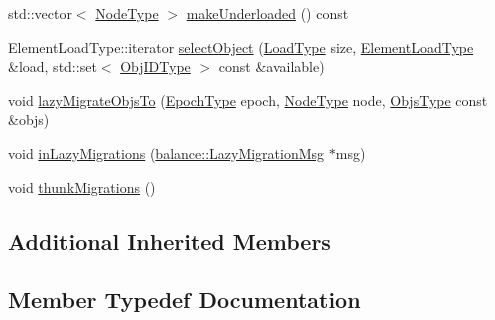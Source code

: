 \begin{DoxyCompactItemize}
\item 
std\+::vector$<$ \hyperlink{namespacevt_a866da9d0efc19c0a1ce79e9e492f47e2}{Node\+Type} $>$ \hyperlink{structvt_1_1vrt_1_1collection_1_1lb_1_1_gossip_l_b_a244326d030b7b9b82328d2ce617fef43}{make\+Underloaded} () const
\item 
Element\+Load\+Type\+::iterator \hyperlink{structvt_1_1vrt_1_1collection_1_1lb_1_1_gossip_l_b_adafa0d7c3295e095149f48c3027b3173}{select\+Object} (\hyperlink{structvt_1_1vrt_1_1collection_1_1lb_1_1_base_l_b_a215e22b9f12678303f49615ae3be05cc}{Load\+Type} size, \hyperlink{structvt_1_1vrt_1_1collection_1_1lb_1_1_base_l_b_aa286d31a0820a8fc9218ccb858368fca}{Element\+Load\+Type} \&load, std\+::set$<$ \hyperlink{structvt_1_1vrt_1_1collection_1_1lb_1_1_base_l_b_a15a2f756b59c8c2437985206b32aa403}{Obj\+I\+D\+Type} $>$ const \&available)
\item 
void \hyperlink{structvt_1_1vrt_1_1collection_1_1lb_1_1_gossip_l_b_a12cd87d3d0f4c186ffca1b554f5086dc}{lazy\+Migrate\+Objs\+To} (\hyperlink{namespacevt_a985a5adf291c34a3ca263b3378388236}{Epoch\+Type} epoch, \hyperlink{namespacevt_a866da9d0efc19c0a1ce79e9e492f47e2}{Node\+Type} node, \hyperlink{structvt_1_1vrt_1_1collection_1_1lb_1_1_gossip_l_b_ad2093cf08cc6af0f3deb4441e40c55a9}{Objs\+Type} const \&objs)
\item 
void \hyperlink{structvt_1_1vrt_1_1collection_1_1lb_1_1_gossip_l_b_a2fa63a6d2dc211423423b0d7de1d1ed6}{in\+Lazy\+Migrations} (\hyperlink{structvt_1_1vrt_1_1collection_1_1balance_1_1_lazy_migration_msg}{balance\+::\+Lazy\+Migration\+Msg} $\ast$msg)
\item 
void \hyperlink{structvt_1_1vrt_1_1collection_1_1lb_1_1_gossip_l_b_a7693c8b06ab78ef3565687621d810450}{thunk\+Migrations} ()
\end{DoxyCompactItemize}
\subsection*{Additional Inherited Members}


\subsection{Member Typedef Documentation}
\mbox{\label{structvt_1_1vrt_1_1collection_1_1lb_1_1_gossip_l_b_af7170ae946da8af68105109f04824f03}} 
